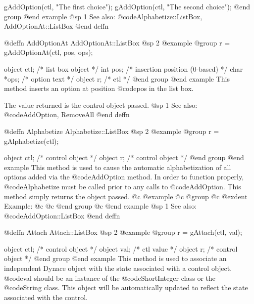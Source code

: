 {gAddOption(ctl, "The first choice");
gAddOption(ctl, "The second choice");
@end group
@end example
@sp 1
See also:  @code{Alphabetize::ListBox, AddOptionAt::ListBox}
@end deffn



@deffn {AddOptionAt} AddOptionAt::ListBox
@sp 2
@example
@group
r = gAddOptionAt(ctl, pos, ops);

object  ctl;    /*  list box object   */
int     pos;    /*  insertion position (0-based)  */
char    *ops;   /*  option text       */
object  r;      /*  ctl               */
@end group
@end example
This method inserts an option at position @code{pos} in the list box.

The value returned is the control object passed.
@sp 1
See also:  @code{AddOption, RemoveAll}
@end deffn















@deffn {Alphabetize} Alphabetize::ListBox
@sp 2
@example
@group
r = gAlphabetize(ctl);

object  ctl;    /*  control object  */
object  r;      /*  control object  */
@end group
@end example
This method is used to cause the automatic alphabetization of all
options added via the @code{AddOption} method.  In order to function
properly, @code{Alphabetize} must be called prior to any calls to
@code{AddOption}.  This method simply returns the object passed.
@c @example
@c @group
@c @exdent Example:
@c 
@c @end group
@c @end example
@sp 1
See also:  @code{AddOption::ListBox}
@end deffn















@deffn {Attach} Attach::ListBox
@sp 2
@example
@group
r = gAttach(ctl, val);

object  ctl;   /*  control object  */
object  val;   /*  ctl value       */
object  r;     /*  control object  */
@end group
@end example
This method is used to associate an independent Dynace object with the
state associated with a control object.  @code{val} should be an
instance of the @code{ShortInteger} class or the @code{String} class.
This object will be automatically updated to reflect the state
associated with the control.

}
